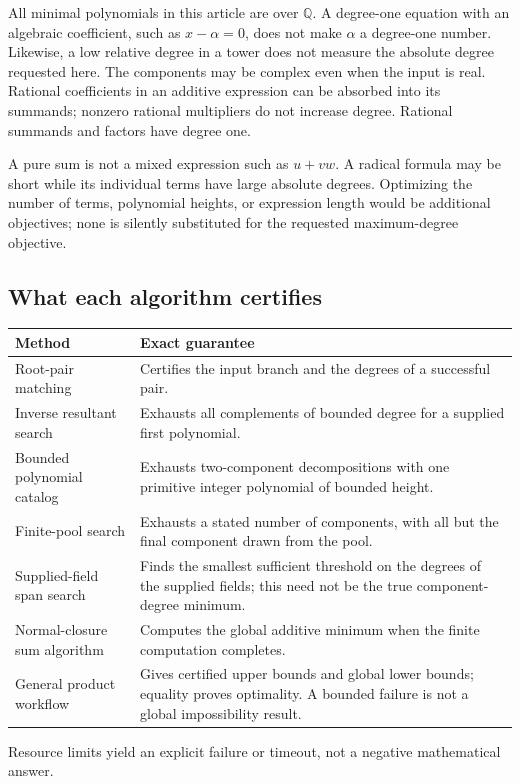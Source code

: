 \documentclass[11pt,letterpaper]{article}
\theoremstyle{definition}
\newcommand{\Q}{\mathbb Q}
\begin{document}
All minimal polynomials in this article are over $\Q$. A degree-one equation with an algebraic coefficient, such as $x-\alpha=0$, does not make $\alpha$ a degree-one number. Likewise, a low relative degree in a tower does not measure the absolute degree requested here. The components may be complex even when the input is real. Rational coefficients in an additive expression can be absorbed into its summands; nonzero rational multipliers do not increase degree. Rational summands and factors have degree one.

A pure sum is not a mixed expression such as $u+vw$. A radical formula may be short while its individual terms have large absolute degrees. Optimizing the number of terms, polynomial heights, or expression length would be additional objectives; none is silently substituted for the requested maximum-degree objective.

\subsection{What each algorithm certifies}
\begin{center}
\small
\begin{tabularx}{\textwidth}{@{}>{\raggedright\arraybackslash}p{}>{\raggedright\arraybackslash}X@{}}
\toprule
Method & Exact guarantee \\
\midrule
Root-pair matching & Certifies the input branch and the degrees of a successful pair. \\
Inverse resultant search & Exhausts all complements of bounded degree for a supplied first polynomial. \\
Bounded polynomial catalog & Exhausts two-component decompositions with one primitive integer polynomial of bounded height. \\
Finite-pool search & Exhausts a stated number of components, with all but the final component drawn from the pool. \\
Supplied-field span search & Finds the smallest sufficient threshold on the degrees of the supplied fields; this need not be the true component-degree minimum. \\
Normal-closure sum algorithm & Computes the global additive minimum when the finite computation completes. \\
General product workflow & Gives certified upper bounds and global lower bounds; equality proves optimality. A bounded failure is not a global impossibility result. \\
\bottomrule
\end{tabularx}
\end{center}
Resource limits yield an explicit failure or timeout, not a negative mathematical answer.
\end{document}
